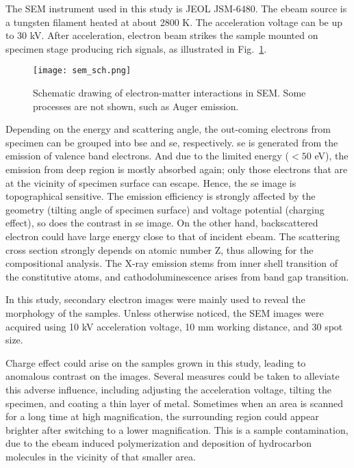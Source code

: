 The SEM instrument used in this study is JEOL JSM-6480. The \gls{ebeam} source is a tungsten filament heated at about 2800 K.\cite{jeolsem} The acceleration voltage can be up to 30 kV. After acceleration, electron beam strikes the sample mounted on specimen stage producing rich signals, as illustrated in Fig.~\ref{fig:ch2sem}. 
\begin{figure}[htb]
\centering
\texttt{[image: sem\_sch.png]}
\caption[Schematic drawing of electron-matter interactions in SEM]{Schematic drawing of electron-matter interactions in SEM.\cite{Good2000} Some processes are not shown, such as Auger emission.}
\label{fig:ch2sem}
\end{figure}
Depending on the energy and scattering angle, the out-coming electrons from specimen can be grouped into \gls{bse} and \gls{se}, respectively. \gls{se} is generated from the emission of valence band electrons. And due to the limited energy ($<50$ eV), the emission from deep region is mostly absorbed again; only those electrons that are at the vicinity of specimen surface can escape. Hence, the \gls{se} image is topographical sensitive. The emission efficiency is strongly affected by the geometry (tilting angle of specimen surface) and voltage potential (charging effect), so does the contrast in \gls{se} image. On the other hand, backscattered electron could have large energy close to that of incident \gls{ebeam}. The scattering cross section strongly depends on atomic number Z, thus allowing for the compositional analysis. The X-ray emission stems from inner shell transition of the constitutive atoms, and cathodoluminescence arises from band gap transition. 

In this study, secondary electron images were mainly used to reveal the morphology of the samples. Unless otherwise noticed, the SEM images were acquired using 10 kV acceleration voltage, 10 mm working distance, and 30 spot size.

Charge effect could arise on the samples grown in this study, leading to anomalous contrast on the images. Several measures could be taken to alleviate this adverse influence, including adjusting the acceleration voltage, tilting the specimen, and coating a thin layer of metal. Sometimes when an area is scanned for a long time at high magnification, the surrounding region could appear brighter after switching to a lower magnification. This is a sample contamination, due to the \gls{ebeam} induced polymerization and deposition of hydrocarbon molecules in the vicinity of that smaller area. 

